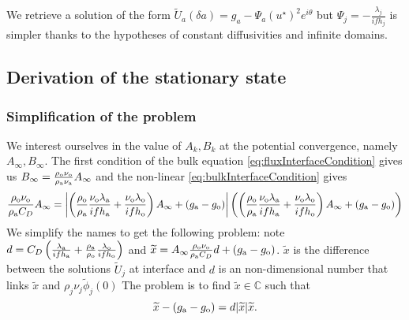 \begin{remark}
We retrieve a solution of the form
$\widetilde{U}_a(\delta a) = g_a - \Psi_a (u^\star)^2 e^{i\theta}$
but $\Psi_j = -\frac{\lambda_j}{if h_j}$ is simpler thanks to the hypotheses of constant diffusivities and infinite domains.
\end{remark}

\subsection{Derivation of the stationary state}
\subsubsection{Simplification of the problem}
We interest ourselves in the
value of $A_k, B_k$ at the potential convergence, namely $A_\infty, B_\infty$.
The first condition of the bulk equation \eqref{eq:fluxInterfaceCondition} gives us $B_\infty = \frac{\rho_{\rm o} \nu_{\rm o}}{\rho_{\rm a} \nu_{\rm a} } A_\infty$
and the non-linear \eqref{eq:bulkInterfaceCondition} gives
\begin{equation} \label{eq:stationaryBulkFirstEq}
    \frac{\rho_{\rm o} \nu_{\rm o}}{\rho_{\rm a} C_D} A_\infty
    =
    \left|
    \left(
    \frac{\rho_{\rm o}}{\rho_{\rm a}}\frac{\nu_{\rm o}\lambda_{\rm a}}{if h_{\rm a}} 
    +\frac{\nu_{\rm o}\lambda_{\rm o}}{if h_{\rm o}} \right) A_\infty
    + (g_{\rm a} - g_{\rm o})
    \right|
    \left(
    \left(
    \frac{\rho_{\rm o}}{\rho_{\rm a}}\frac{\nu_{\rm o}\lambda_{\rm a}}{if h_{\rm a}} 
    +\frac{\nu_{\rm o}\lambda_{\rm o}}{if h_{\rm o}} \right) A_\infty
    + (g_{\rm a} - g_{\rm o})
    \right)
\end{equation}
We simplify the names to get the following problem:
note $d = C_D \left(
    \frac{\lambda_{\rm a}}{if h_{\rm a}} 
    +\frac{\rho_{\rm a}}{\rho_{\rm o}}\frac{\lambda_{\rm o}}{if h_{\rm o}} \right)$ and
$\widetilde{x} = A_\infty \frac{\rho_{\rm o} \nu_{\rm o}}{\rho_{\rm a} C_D}d+\left(g_{\rm a} - g_{\rm o}\right)$.
$\widetilde{x}$ is the difference between the
solutions $\widetilde{U}_j$ at interface
and $d$ is an non-dimensional number that links
$\widetilde{x}$ and $\rho_j \nu_j \widetilde{\phi}_j(0)$
The problem is to find $\widetilde{x}\in \mathbb{C}$ such that
\begin{equation} \label{eq:mainEqSimplified}
    \widetilde{x} - \left(g_{\rm a} - g_{\rm o}\right) = d|\widetilde{x}|\widetilde{x}.
\end{equation}
